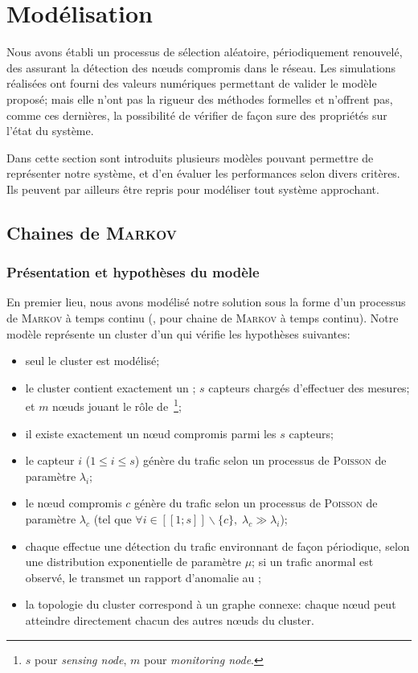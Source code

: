 \section{Modélisation}
\label{sa:sec:modelisation}

Nous avons établi un processus de sélection aléatoire, périodiquement renouvelé, des \cns assurant la détection des nœuds compromis dans le réseau.
Les simulations réalisées ont fourni des valeurs numériques permettant de valider le modèle proposé; mais elle n'ont pas la rigueur des méthodes formelles et n'offrent pas, comme ces dernières, la possibilité de vérifier de façon sure des propriétés sur l'état du système.

Dans cette section sont introduits plusieurs modèles pouvant permettre de représenter notre système, et d'en évaluer les performances selon divers critères.
Ils peuvent par ailleurs être repris pour modéliser tout système approchant.

    \subsection{Chaines de \textsc{Markov}}

        \subsubsection{Présentation et hypothèses du modèle}
En premier lieu, nous avons modélisé notre solution sous la forme d'un processus de \textsc{Markov} à temps continu (\cmtc, pour chaine de \textsc{Markov} à temps continu).
Notre modèle représente un cluster d'un \rcsf qui vérifie les hypothèses suivantes:
\begin{itemize}
    \item seul le cluster est modélisé;
    \item le cluster contient exactement un \CH; $s$ capteurs chargés d'effectuer des mesures; et $m$ nœuds jouant le rôle de \cns\,\footnote{$s$ pour \textit{sensing node}, $m$ pour \textit{monitoring node}.};
    \item il existe exactement un nœud compromis parmi les $s$ capteurs;
    \item le capteur $i$ ($1 \leq i \leq s$) génère du trafic selon un processus de \textsc{Poisson} de paramètre $\lambda_i$;
    \item le nœud compromis $c$ génère du trafic selon un processus de \textsc{Poisson} de paramètre $\lambda_c$ (tel que $\forall i\in[\![1;s]\!]\backslash\{c\},\; \lambda_c\gg\lambda_i$);
    \item chaque \cn effectue une détection du trafic environnant de façon périodique, selon une distribution exponentielle de paramètre $\mu$; si un trafic anormal est observé, le \cn transmet un rapport d'anomalie au \CH;
    \item la topologie du cluster correspond à un graphe connexe: chaque nœud peut atteindre directement chacun des autres nœuds du cluster.
\end{itemize}

